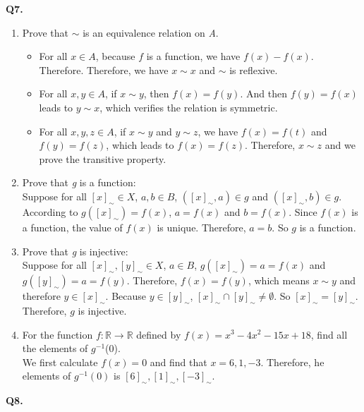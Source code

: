 \documentclass{article}[12pt]
\begin{document}
\noindent \textbf{Q7.}
\begin{enumerate}
\item Prove that $\sim$ is an equivalence relation on \textit{A}.
\begin{itemize}
\item For all $x\in A$, because $f$ is a function, we have $f(x)-f(x)$. Therefore. Therefore, we have $x\sim x$ and $\sim$ is reflexive.
\item For all $x,y\in A$, if $x\sim y$, then $f(x)=f(y)$. And then $f(y)=f(x)$ leads to $y\sim x$, which verifies the relation is symmetric.
\item For all $x,y,z\in A$, if $x\sim y$ and $y\sim z$, we have $f(x)=f(t)$ and $f(y)=f(z)$, which leads to $f(x)=f(z)$. Therefore, $x\sim z$ and we prove the transitive property.
\end{itemize}
\item Prove that \textit{g} is a function:\\
Suppose for all $[x]_{\sim}\in X$, $a,b\in B$, $([x]_{\sim},a)\in g$ and $([x]_{\sim},b)\in g$. According to $g\left([x]_{\sim}\right)=f(x)$, $a=f(x)$ and $b=f(x)$. Since $f(x)$ is a function, the value of $f(x)$ is unique. Therefore, $a=b$. So $g$ is a function.
\item Prove that \textit{g} is injective:\\
Suppose for all $[x]_{\sim},[y]_{\sim}\in X$, $a\in B$, $g\left([x]_{\sim}\right)=a=f(x)$ and $g\left([y]_{\sim}\right)=a=f(y)$. Therefore, $f(x)=f(y)$, which means $x\sim y$ and therefore $y\in [x]_{\sim}$. Because $y\in [y]_{\sim}$, $[x]_{\sim}\cap [y]_{\sim}\not=\emptyset$. So $[x]_{\sim}=[y]_{\sim}$. Therefore, $g$ is injective.
\item For the function $f:\mathbb{R} \longrightarrow \mathbb{R}$ defined by $f(x) = x^3- 4x^2-15x + 18$, find all the elements of $g^{-1}$(0).\\
We first calculate $f(x)=0$ and find that $x=6,1,-3$. Therefore, he elements of $g^{-1}(0)$ is $[6]_{\sim}, [1]_{\sim}, [-3]_{\sim}$.
\end{enumerate}
\noindent \textbf{Q8.}
\end{document}
